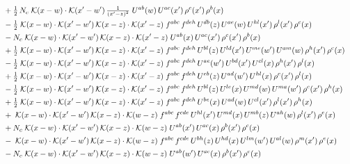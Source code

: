 \documentclass[9pt]{article}
\begin{document}
\begin{align}
&\quad +\tfrac{1}{2}\,N_c\;\mathcal{K}(x-w)\cdot\mathcal{K}(x'-w')\,\tfrac{1}{(x'-z)^{2}}\;U^{ab}(w)\,U^{ac}(x')\,\rho^{c}(x')\,\rho^{b}(x)\notag\\
&\quad -\tfrac{1}{2}\;\mathcal{K}(x-w)\cdot\mathcal{K}(x'-w')\,\mathcal{K}(x-z)\cdot\mathcal{K}(x'-z)\;f^{abc}\,f^{deh}\,U^{db}(z)\,U^{ae}(w)\,U^{hl}(x')\,\rho^{l}(x')\,\rho^{c}(x)\notag\\
&\quad -N_c\;\mathcal{K}(x-w)\cdot\mathcal{K}(x'-w')\,\mathcal{K}(x-z)\cdot\mathcal{K}(x'-z)\;U^{ab}(x)\,U^{ac}(x')\,\rho^{c}(x')\,\rho^{b}(x)\notag\\
&\quad +\tfrac{1}{2}\;\mathcal{K}(x-w)\cdot\mathcal{K}(x'-w')\,\mathcal{K}(x-z)\cdot\mathcal{K}(x'-z)\;f^{abc}\,f^{deh}\,U^{bl}(z)\,U^{ld}(x')\,U^{me}(w')\,U^{am}(w)\,\rho^{h}(x')\,\rho^{c}(x)\notag\\
&\quad -\tfrac{1}{2}\;\mathcal{K}(x-w)\cdot\mathcal{K}(x'-w')\,\mathcal{K}(x-z)\cdot\mathcal{K}(x'-z)\;f^{abc}\,f^{deh}\,U^{ae}(w')\,U^{bd}(x')\,U^{cl}(x)\,\rho^{h}(x')\,\rho^{l}(x)\notag\\
&\quad +\tfrac{1}{2}\;\mathcal{K}(x-w)\cdot\mathcal{K}(x'-w')\,\mathcal{K}(x-z)\cdot\mathcal{K}(x'-z)\;f^{abc}\,f^{deh}\,U^{eb}(z)\,U^{ad}(w')\,U^{hl}(x)\,\rho^{c}(x')\,\rho^{l}(x)\notag\\
&\quad -\tfrac{1}{2}\;\mathcal{K}(x-w)\cdot\mathcal{K}(x'-w')\,\mathcal{K}(x-z)\cdot\mathcal{K}(x'-z)\;f^{abc}\,f^{deh}\,U^{bl}(z)\,U^{le}(x)\,U^{md}(w)\,U^{ma}(w')\,\rho^{c}(x')\,\rho^{h}(x)\notag\\
&\quad +\tfrac{1}{2}\;\mathcal{K}(x-w)\cdot\mathcal{K}(x'-w')\,\mathcal{K}(x-z)\cdot\mathcal{K}(x'-z)\;f^{abc}\,f^{deh}\,U^{be}(x)\,U^{ad}(w)\,U^{cl}(x')\,\rho^{l}(x')\,\rho^{h}(x)\notag\\
&\quad +\;\mathcal{K}(x-w)\cdot\mathcal{K}(x'-w')\,\mathcal{K}(x-z)\cdot\mathcal{K}(w-z)\;f^{abc}\,f^{cde}\,U^{hl}(x')\,U^{md}(x)\,U^{mb}(z)\,U^{ah}(w)\,\rho^{l}(x')\,\rho^{e}(x)\notag\\
&\quad +N_c\;\mathcal{K}(x-w)\cdot\mathcal{K}(x'-w')\,\mathcal{K}(x-z)\cdot\mathcal{K}(w-z)\;U^{ab}(x')\,U^{ac}(x)\,\rho^{b}(x')\,\rho^{c}(x)\notag\\
&\quad -\;\mathcal{K}(x-w)\cdot\mathcal{K}(x'-w')\,\mathcal{K}(x-z)\cdot\mathcal{K}(w-z)\;f^{abc}\,f^{cde}\,U^{bh}(z)\,U^{hd}(x)\,U^{lm}(w')\,U^{al}(w)\,\rho^{m}(x')\,\rho^{e}(x)\notag\\
&\quad -N_c\;\mathcal{K}(x-w)\cdot\mathcal{K}(x'-w')\,\mathcal{K}(x-z)\cdot\mathcal{K}(w-z)\;U^{ab}(w')\,U^{ac}(x)\,\rho^{b}(x')\,\rho^{c}(x)\notag\\

\end{align}
\end{document}
